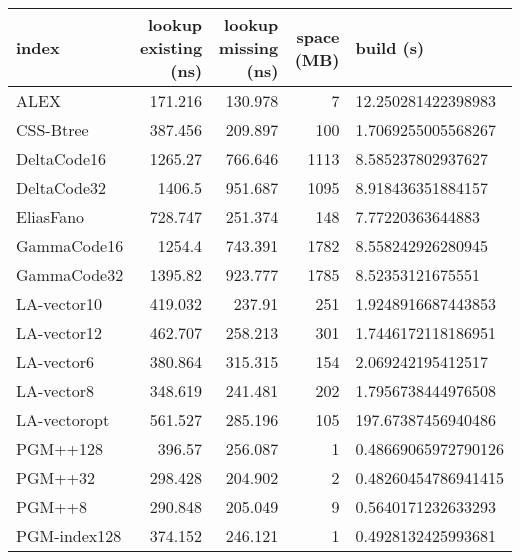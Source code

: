 \begin{tabular}{lrrrl}
\hline
 index             &   lookup existing (ns) &   lookup missing (ns) &   space (MB) & build (s)             \\
\hline
 ALEX              &                171.216 &              130.978  &            7 & 12.250281422398983    \\
 CSS-Btree         &                387.456 &              209.897  &          100 & 1.7069255005568267    \\
 DeltaCode16       &               1265.27  &              766.646  &         1113 & 8.585237802937627     \\
 DeltaCode32       &               1406.5   &              951.687  &         1095 & 8.918436351884157     \\
 EliasFano         &                728.747 &              251.374  &          148 & 7.77220363644883      \\
 GammaCode16       &               1254.4   &              743.391  &         1782 & 8.558242926280945     \\
 GammaCode32       &               1395.82  &              923.777  &         1785 & 8.52353121675551      \\
 LA-vector10       &                419.032 &              237.91   &          251 & 1.9248916687443853    \\
 LA-vector12       &                462.707 &              258.213  &          301 & 1.7446172118186951    \\
 LA-vector6        &                380.864 &              315.315  &          154 & 2.069242195412517     \\
 LA-vector8        &                348.619 &              241.481  &          202 & 1.7956738444976508    \\
 LA-vectoropt      &                561.527 &              285.196  &          105 & 197.67387456940486    \\
 PGM++128          &                396.57  &              256.087  &            1 & 0.48669065972790126   \\
 PGM++32           &                298.428 &              204.902  &            2 & 0.48260454786941415   \\
 PGM++8            &                290.848 &              205.049  &            9 & 0.5640171232633293    \\
 PGM-index128      &                374.152 &              246.121  &            1 & 0.4928132425993681    \\

\end{tabular}
